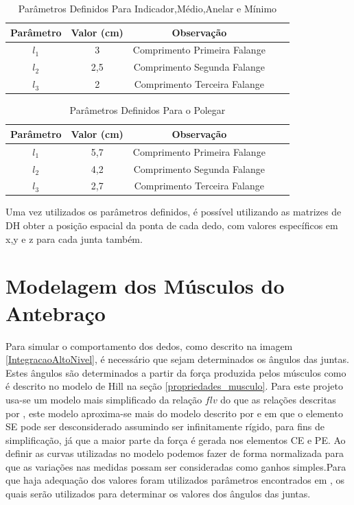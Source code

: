 \begin{table}[H]
\centering
\caption{Parâmetros Definidos Para Indicador,Médio,Anelar e Mínimo}
\label{ParamResto}
\begin{tabular}{|c|c|c|c|c|}
	\hline
    Parâmetro & Valor (cm) & Observação \\ \hline
    $l_1$ & 3 & Comprimento Primeira Falange \\ \hline
    $l_2$ & 2,5 & Comprimento Segunda Falange \\ \hline
    $l_3$ & 2 & Comprimento Terceira Falange \\ \hline
\end{tabular}
\end{table}

\begin{table}[H]
\centering
\caption{Parâmetros Definidos Para o Polegar}
\label{ParamPolegar}
\begin{tabular}{|c|c|c|c|c|}
	\hline
    Parâmetro & Valor (cm) & Observação \\ \hline
    $l_1$ & 5,7 & Comprimento Primeira Falange \\ \hline
    $l_2$ & 4,2 & Comprimento Segunda Falange \\ \hline
    $l_3$ & 2,7 & Comprimento Terceira Falange \\ \hline
\end{tabular}
\end{table}

Uma vez utilizados os parâmetros definidos, é possível utilizando as matrizes de DH obter a posição espacial da ponta de cada dedo, com valores específicos em x,y e z para cada junta também.

\section{Modelagem dos Músculos do Antebraço}
\label{modelagem_antebraco}
Para simular o comportamento dos dedos, como descrito na imagem \ref{IntegracaoAltoNivel}, é necessário que sejam determinados os ângulos das juntas. Estes ângulos são determinados a partir da força produzida pelos músculos como é descrito no modelo de Hill na seção \ref{propriedades_musculo}. Para este projeto usa-se um modelo mais simplificado da relação $flv$ do que as relações descritas por \cite{rosen1999performances}, este modelo aproxima-se mais do modelo descrito por \cite{zajac1989muscle} e \cite{durfee1994estimation} em que o elemento SE pode ser desconsiderado assumindo ser infinitamente rígido, para fins de simplificação, já que a maior parte da força é gerada nos elementos CE e PE. Ao definir as curvas utilizadas no modelo podemos fazer de forma normalizada para que as variações nas medidas possam ser consideradas como ganhos simples.Para que haja adequação dos valores foram utilizados parâmetros encontrados em \cite{lemay1996dynamic}, os quais serão utilizados para determinar os valores dos ângulos das juntas.

